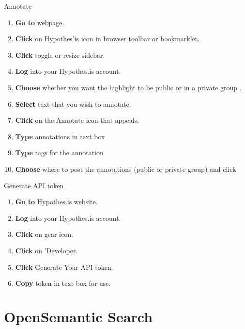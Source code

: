 \documentclass[10pt,a4paper]{article}
\begin{document}
\begin{textbox}{Annotate}
 

  

\begin{enumerate}
\item \textbf{Go to} webpage. 
\item \textbf{Click} on Hypothes'is icon in browser toolbar or bookmarklet.
\item \textbf{Click} toggle or resize sidebar.
\item \textbf{Log} into your Hypothes.is account.
\item \textbf{Choose} whether you want the highlight to be public or in a private group .
\item \textbf{Select} text that you wish to annotate.
\item \textbf{Click} on the Annotate icon that appeals.
\item \textbf{Type} annotations in text box
\item \textbf{Type} tags for the annotation
\item \textbf{Choose} where to post the annotations (public or private group) and click 

\end{enumerate}

\end{textbox}


\begin{textbox}{Generate API token}
 

  

\begin{enumerate}
\item \textbf{Go to} Hypothes.is website. 
\item \textbf{Log} into your Hypothes.is account.
\item \textbf{Click} on gear icon.
\item \textbf{Click} on 'Developer.
\item \textbf{Click} Generate Your API token.
\item \textbf{Copy} token in text box for use.

\end{enumerate}

\end{textbox}


\section{OpenSemantic Search}
\end{document}
